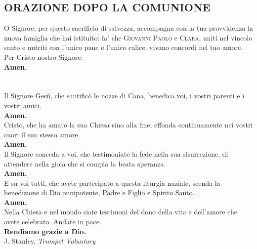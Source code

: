 \documentclass[10pt,b6paper,usenames,twoside]{article}
\begin{document}
\subsection*{\textcolor{forestgreen(traditional)}{ORAZIONE DOPO LA COMUNIONE}} 
\noindent O Signore, per questo sacrificio di salvezza, accompagna con la tua provvidenza la nuova famiglia che hai istituito: fa' che \textcolor{forestgreen(traditional)}{\textsc{Giovanni Paolo}} e \textcolor{forestgreen(traditional)}{\textsc{Clara}}, uniti nel vincolo santo e nutriti con l'unico pane e l'unico calice, vivano concordi nel tuo amore. Per Cristo nostro Signore.\\
\noindent \textbf{Amen.} 
\clearpage

\section*{\textcolor{forestgreen(traditional)}{}} 
  
\noindent Il Signore Gesù, che santificò le nozze di Cana, benedica voi, i vostri parenti e i vostri amici.\\
\textbf{Amen.}\\ 

\noindent Cristo, che ha amato la sua Chiesa sino alla fine, effonda continuamente nei vostri cuori il suo stesso amore.\\
\textbf{Amen.}\\ 

\noindent Il Signore conceda a voi, che testimoniate la fede nella sua risurrezione, di attendere nella gioia che si compia la beata speranza.\\
\textbf{Amen.}\\ 

\noindent E su voi tutti, che avete partecipato a questa liturgia nuziale, scenda la benedizione di Dio onnipotente, Padre e Figlio \textcolor{forestgreen(traditional)}{\CrossMaltese} e Spirito Santo.\\ \textbf{Amen.}\\ 

\noindent Nella Chiesa  e nel mondo siate testimoni del dono della vita e dell'amore che avete celebrato. Andate in pace.\\ 
\textbf{Rendiamo grazie a Dio.}\\

\noindent \textcolor{forestgreen(traditional)}{\Acht} \hspace*{0mm} J. Stanley, \textit{Trumpet Voluntary}\\
\end{document}
